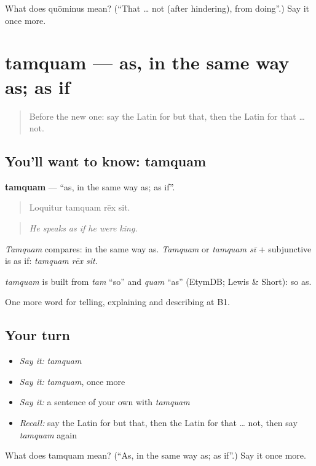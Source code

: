 \begin{tcolorbox}[breakable,colback=teal!4,colframe=teal!35!black,title={Before you move on}]
What does quōminus mean? (\textquotedblleft{}That … not (after hindering), from doing\textquotedblright{}.) Say it once more.
\end{tcolorbox}
\section[tamquam]{tamquam — as, in the same way as; as if}

\label{lesson:LA-C367-tamquam}



\begin{quote}
Before the new one: say the Latin for but that, then the Latin for that … not.
\end{quote}

\subsection*{You'll want to know: tamquam}
\textbf{tamquam} — \textquotedblleft{}as, in the same way as; as if\textquotedblright{}.

\begin{quote}
Loquitur tamquam rēx sit.
\end{quote}

\begin{quote}
\emph{He speaks as if he were king.}
\end{quote}

\emph{Tamquam} compares: in the same way as. \emph{Tamquam} or \emph{tamquam sī} + subjunctive is as if: \emph{tamquam rēx sit}.

\begin{cousinweb}
\emph{tamquam} is built from \emph{tam} \textquotedblleft{}so\textquotedblright{} and \emph{quam} \textquotedblleft{}as\textquotedblright{} (EtymDB; Lewis \& Short): so as.
\end{cousinweb}

\begin{grammarlens}[title={What you've built}]
One more word for telling, explaining and describing at B1.
\end{grammarlens}

\subsection*{Your turn}
\begin{itemize}
\raggedright
  \item \emph{Say it:} \emph{tamquam}
  \item \emph{Say it:} \emph{tamquam}, once more
  \item \emph{Say it:} a sentence of your own with \emph{tamquam}
  \item \emph{Recall:} say the Latin for but that, then the Latin for that … not, then say \emph{tamquam} again
\end{itemize}

\begin{tcolorbox}[breakable,colback=teal!4,colframe=teal!35!black,title={Before you move on}]
What does tamquam mean? (\textquotedblleft{}As, in the same way as; as if\textquotedblright{}.) Say it once more.
\end{tcolorbox}
